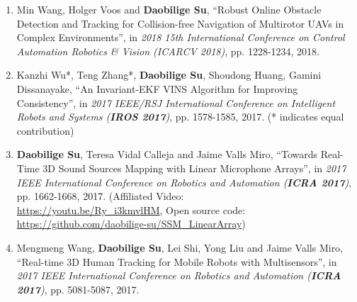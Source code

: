 \documentclass[margin,line]{res}
\begin{document}
\begin{resume}
\begin{enumerate}
\item Min Wang, Holger Voos and {\bf Daobilige Su}, ``Robust Online Obstacle Detection and Tracking for Collision-free Navigation of Multirotor UAVs in Complex Environments'', in {\it 2018 15th International Conference on Control Automation Robotics \& Vision (ICARCV 2018)}, pp. 1228-1234, 2018.

\item Kanzhi Wu*, Teng Zhang*, {\bf Daobilige Su}, Shoudong Huang, Gamini Dissanayake, ``An Invariant-EKF VINS Algorithm for Improving Consistency'', in {\it 2017 IEEE/RSJ International Conference on Intelligent Robots and Systems (\textbf{IROS 2017})}, pp. 1578-1585, 2017.
(* indicates equal contribution)

\item {\bf Daobilige Su}, Teresa Vidal Calleja and Jaime Valls Miro, ``Towards Real-Time 3D Sound Sources Mapping with Linear Microphone Arrays'', in {\it 2017 IEEE International Conference on Robotics and Automation (\textbf{ICRA 2017})}, pp. 1662-1668, 2017.
(Affiliated Video: \\ \href{https://youtu.be/Ry_i3kmvlHM}{{https://youtu.be/Ry\_i3kmvlHM}}, Open source code: \\ \href{https://github.com/daobilige-su/SSM_LinearArray}{{https://github.com/daobilige-su/SSM\_LinearArray}})

\item Mengmeng Wang, {\bf Daobilige Su}, Lei Shi, Yong Liu and Jaime Valls Miro, ``Real-time 3D Human Tracking for Mobile Robots with Multisensors'', in {\it 2017 IEEE International Conference on Robotics and Automation (\textbf{ICRA 2017})}, pp. 5081-5087, 2017.


\end{enumerate}
\end{resume}
\end{document}
